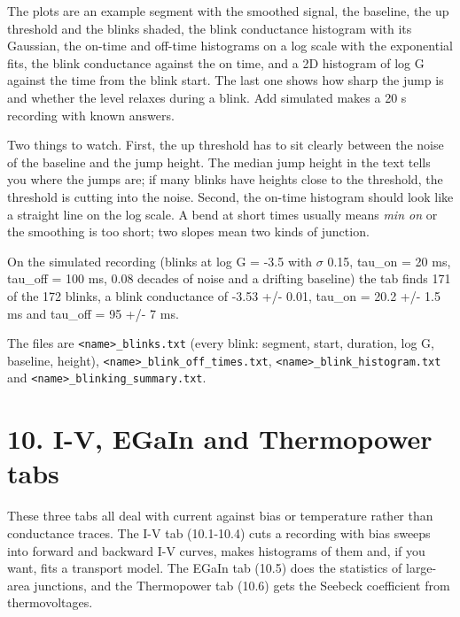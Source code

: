 \documentclass[
  11pt,
  a4paper,
]{article}
\begin{document}
The plots are an example segment with the smoothed signal, the baseline,
the up threshold and the blinks shaded, the blink conductance histogram
with its Gaussian, the on-time and off-time histograms on a log scale
with the exponential fits, the blink conductance against the on time,
and a 2D histogram of log G against the time from the blink start. The
last one shows how sharp the jump is and whether the level relaxes
during a blink. Add simulated makes a 20 s recording with known answers.

Two things to watch. First, the up threshold has to sit clearly between
the noise of the baseline and the jump height. The median jump height in
the text tells you where the jumps are; if many blinks have heights
close to the threshold, the threshold is cutting into the noise. Second,
the on-time histogram should look like a straight line on the log scale.
A bend at short times usually means \emph{min on} or the smoothing is
too short; two slopes mean two kinds of junction.

On the simulated recording (blinks at log G = -3.5 with $\sigma$ 0.15,
tau\_on = 20 ms, tau\_off = 100 ms, 0.08 decades of noise and a drifting
baseline) the tab finds 171 of the 172 blinks, a blink conductance of
-3.53 +/- 0.01, tau\_on = 20.2 +/- 1.5 ms and tau\_off = 95 +/- 7 ms.

The files are
\texttt{\textless{}name\textgreater{}\_\allowbreak{}blinks.txt} (every
blink: segment, start, duration, log G, baseline, height),
\texttt{\textless{}name\textgreater{}\_\allowbreak{}blink\_\allowbreak{}off\_\allowbreak{}times.txt},
\texttt{\textless{}name\textgreater{}\_\allowbreak{}blink\_\allowbreak{}histogram.txt}
and
\texttt{\textless{}name\textgreater{}\_\allowbreak{}blinking\_\allowbreak{}summary.txt}.

\hypertarget{i-v-egain-and-thermopower-tabs}{%
\section{10. I-V, EGaIn and Thermopower
tabs}\label{i-v-egain-and-thermopower-tabs}}

These three tabs all deal with current against bias or temperature
rather than conductance traces. The I-V tab (10.1-10.4) cuts a recording
with bias sweeps into forward and backward I-V curves, makes histograms
of them and, if you want, fits a transport model. The EGaIn tab (10.5)
does the statistics of large-area junctions, and the Thermopower tab
(10.6) gets the Seebeck coefficient from thermovoltages.
\end{document}
